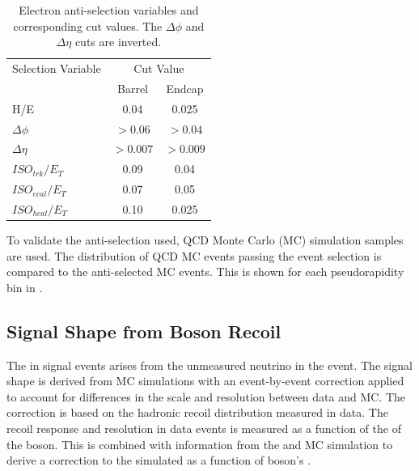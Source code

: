 \begin{table}[htbp]
  \begin{center}
    \leavevmode
    \begin{tabular}{lcc} 
    \toprule
      Selection Variable & \multicolumn{2}{c}{Cut Value}\\
                         & Barrel & Endcap\\
    \midrule
        H/E & 0.04 & 0.025 \\
        $\Delta\phi$ & $>0.06$  & $>0.04$ \\
        $\Delta\eta$ & $>0.007$ & $>0.009$\\
        $ISO_{trk} / E_T $ & 0.09 & 0.04 \\
        $ISO_{ecal}/ E_T$  & 0.07 & 0.05 \\
        $ISO_{hcal}/ E_T$  & 0.10 & 0.025\\ 
    \bottomrule
    \end{tabular}
    \caption[Electron anti-selection variables and corresponding cut values.]
{\label{tab:antisel} Electron anti-selection variables and corresponding cut
values. The $\Delta\phi$ and $\Delta\eta$ cuts are
inverted\cite{baisini2010electron}.}
  \end{center}
\end{table}

To validate the anti-selection used, {QCD} Monte Carlo (MC) simulation samples are used. The
distribution of {QCD} MC events passing the event selection is compared to the
anti-selected MC events. This is shown for each pseudorapidity bin in
.

\subsection{Signal \ETm Shape from Boson Recoil}
\label{sec:recoil}
The \ETm in signal events arises from the unmeasured neutrino in the event. 
The signal \ETm shape is derived from MC simulations with an event-by-event
correction applied to account for differences in the \ETm scale and resolution
between data and MC.
The correction is based on the hadronic recoil distribution measured in data.
The recoil response and resolution in \HepProcess{\PZ\to\Plepton\Plepton} data
events is measured as a function of the \pT of the boson. This is combined with
information from the \PW and \PZ MC simulation to derive a correction to
the simulated \ETm as a function of \PW boson's \pT
\cite{bauer2010modeling,alcaraz2010updated}.

